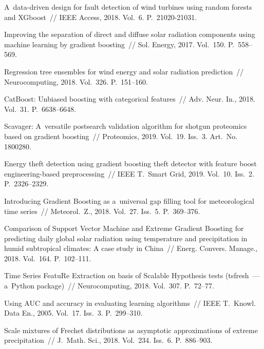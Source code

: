 \begin{multicols}{2}
{{\begin{thebibliography}{99}
 A~data-driven design for fault detection of wind turbines using random
forests and XGboost~// IEEE Access, 2018. Vol.~6. P.~21020-21031.

Improving the separation of direct and diffuse solar radiation 
components using machine learning by gradient boosting~// Sol. Energy, 2017. 
Vol.~150. P.~558--569.

 Regression tree ensembles for wind energy and solar radiation prediction~// 
 Neurocomputing, 2018. Vol.~326. P.~151--160.

CatBoost: Unbiased boosting with categorical features~// 
Adv. Neur. In., 2018. Vol.~31. P.~6638--6648.

Scavager: A~versatile postsearch validation algorithm for shotgun proteomics 
based on gradient boosting~// Proteomics, 2019. Vol.~19. Iss.~3. Art.~No.\,1800280.

 Energy theft detection using gradient boosting 
theft detector with feature boost
engineering-based preprocessing~// IEEE T.~Smart Grid, 2019. Vol.~10. 
Iss.~2. P.~2326--2329.

Introducing Gradient Boosting as a~universal gap filling tool 
for meteorological time series~// Meteorol.~Z., 2018. Vol.~27. 
Iss.~5. P.~369--376.

Comparison of Support Vector Machine and Extreme Gradient Boosting for 
predicting daily global solar radiation using temperature and precipitation 
in humid subtropical climates: A case study in China~// 
Energ. Convers. Manage., 2018. Vol.~164. P.~102--111.

Time Series FeatuRe Extraction on basis of Scalable Hypothesis tests 
(tsfresh~--- a~Python package)~// Neurocomputing, 2018. Vol.~307. P.~72--77.

 Using AUC and accuracy in evaluating learning algorithms~// 
IEEE T.~Knowl. Data En., 2005. Vol.~17. Iss.~3. P.~299--310.
  
 Scale mixtures of
Frechet distributions as asymptotic approximations of extreme precipitation~// 
J.~Math. Sci., 2018. Vol.~234. Iss.~6. P.~886--903.

 \end{thebibliography}

 }
 }

\end{multicols}

